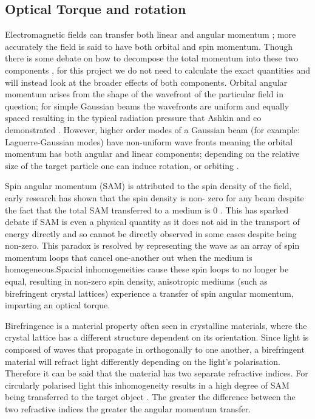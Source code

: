 \subsection{Optical Torque and rotation}
\label{sec:opt_torque}
Electromagnetic fields can transfer both linear and angular momentum \cite{Beth1936MechanicalDA}; more accurately the field is said to have 
both orbital and spin momentum. Though there is some debate on how to decompose the total momentum into these two components \cite{Bruce2020, Svak2018}, for this project we do not need to calculate the exact 
quantities and will instead look at the broader effects of both 
components. Orbital angular momentum arises from the shape of the 
wavefront of the particular field in question; for simple Gaussian 
beams the wavefronts are uniform and equally spaced resulting in the 
typical radiation pressure that Ashkin and co demonstrated 
\cite{Ashkin1980}. However, higher order modes of a Gaussian beam (for example: Laguerre-Gaussian modes) have non-uniform wave fronts meaning 
the orbital momentum has both angular and linear components; depending 
on the relative size of the target particle one can induce rotation, 
or orbiting \cite{Bruce2020, Courtial2000}. 

Spin angular momentum (SAM) is attributed to the spin density of 
the field, early research has shown that the spin density is non-
zero for any beam despite the fact that the total SAM transferred 
to a medium is 0 \cite{Svak2018, Bliokh2014}. This has sparked 
debate if SAM is even a physical quantity as it does not aid in 
the transport of energy directly \cite{Bliokh2014} and so cannot 
be directly observed in some cases despite being non-zero. This 
paradox is resolved by representing the wave as an array of spin 
momentum loops that cancel one-another out when the medium is 
homogeneous.Spacial inhomogeneities cause these spin loops to no 
longer be equal, resulting in non-zero spin density, anisotropic 
mediums (such as birefringent crystal lattices) experience a 
transfer of spin angular momentum, imparting an optical torque.

Birefringence is a material property often seen in crystalline 
materials, where the crystal lattice has a different structure 
dependent on its orientation. Since light is composed of waves 
that propagate in orthogonally to one another, a birefringent 
material will refract light differently depending on the light's 
polarisation. Therefore it can be said that the material has 
two separate refractive indices. For circularly polarised light 
this inhomogeneity results in a high degree of SAM being 
transferred to the target object \cite{Parkin2009, Arita2016}. 
The greater the difference between the two refractive indices the 
greater the angular momentum transfer.

